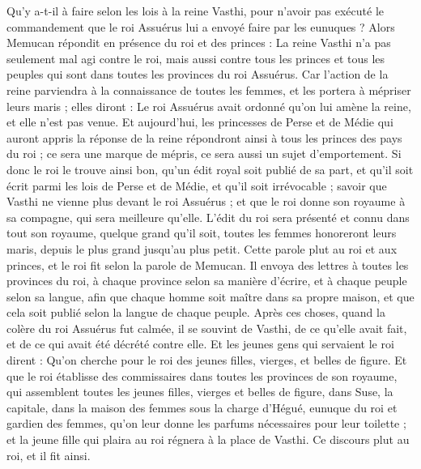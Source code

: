 \begin{multicols}{2}
Qu’y a-t-il à faire selon les lois à la reine Vasthi, pour n’avoir pas exécuté le commandement que le roi Assuérus lui a envoyé faire par les eunuques ?
Alors Memucan répondit en présence du roi et des princes : La reine Vasthi n'a pas seulement mal agi contre le roi, mais aussi contre tous les princes et tous les peuples qui sont dans toutes les provinces du roi Assuérus.
Car l'action de la reine parviendra à la connaissance de toutes les femmes, et les portera à mépriser leurs maris ; elles diront : Le roi Assuérus avait ordonné qu'on lui amène la reine, et elle n'est pas venue.
Et aujourd’hui, les princesses de Perse et de Médie qui auront appris la réponse de la reine répondront ainsi à tous les princes des pays du roi ; ce sera une marque de mépris, ce sera aussi un sujet d’emportement.
Si donc le roi le trouve ainsi bon, qu'un édit royal soit publié de sa part, et qu'il soit écrit parmi les lois de Perse et de Médie, et qu’il soit irrévocable ; savoir que Vasthi ne vienne plus devant le roi Assuérus ; et que le roi donne son royaume à sa compagne, qui sera meilleure qu’elle.
L’édit du roi sera présenté et connu dans tout son royaume, quelque grand qu'il soit, toutes les femmes honoreront leurs maris, depuis le plus grand jusqu'au plus petit.
Cette parole plut au roi et aux princes, et le roi fit selon la parole de Memucan.
Il envoya des lettres à toutes les provinces du roi, à chaque province selon sa manière d’écrire, et à chaque peuple selon sa langue, afin que chaque homme soit maître dans sa propre maison, et que cela soit publié selon la langue de chaque peuple.
\VerseOne{}Après ces choses, quand la colère du roi Assuérus fut calmée, il se souvint de Vasthi, de ce qu'elle avait fait, et de ce qui avait été décrété contre elle.
Et les jeunes gens qui servaient le roi dirent : Qu'on cherche pour le roi des jeunes filles, vierges, et belles de figure.
Et que le roi établisse des commissaires dans toutes les provinces de son royaume, qui assemblent toutes les jeunes filles, vierges et belles de figure, dans Suse, la capitale, dans la maison des femmes sous la charge d'Hégué, eunuque du roi et gardien des femmes, qu'on leur donne les parfums nécessaires pour leur toilette ;
et la jeune fille qui plaira au roi régnera à la place de Vasthi. Ce discours plut au roi, et il fit ainsi.

\end{multicols}
